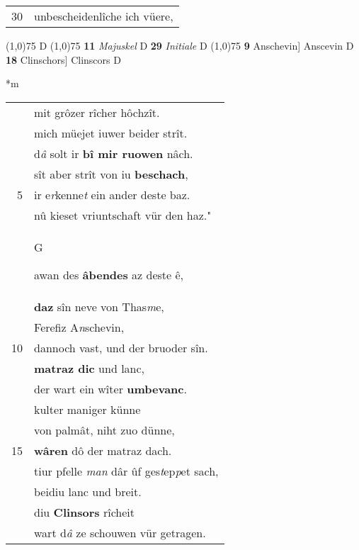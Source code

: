 \documentclass[8pt,a4paper,notitlepage]{article}
\begin{document}
\begin{table}[ht]
\begin{minipage}[t]{0.5\linewidth}
\begin{tabular}{rl}
30 & unbescheidenlîche ich vüere,\\ 
\end{tabular}
\scriptsize
\line(1,0){75} \newline
D \newline
\line(1,0){75} \newline
\textbf{11} \textit{Majuskel} D  \textbf{29} \textit{Initiale} D  \newline
\line(1,0){75} \newline
\textbf{9} Anschevin] Anscevin D \textbf{18} Clinschors] Clinscors D \newline
\end{minipage}
\hspace{0.5cm}
\begin{minipage}[t]{0.5\linewidth}
\small
\begin{center}*m
\end{center}
\begin{tabular}{rl}
 & mit grôzer rîcher hôchzît.\\ 
 & mich müejet iuwer beider strît.\\ 
 & d\textit{â} solt ir \textbf{bî mir ruowen} nâch.\\ 
 & sît aber strît von iu \textbf{beschach},\\ 
5 & ir e\textit{r}kenne\textit{t} ein ander deste baz.\\ 
 & nû kieset vriuntschaft vür den haz."\\ 
 & \begin{large}G\end{large}awan des \textbf{âbendes} az deste ê,\\ 
 & \textbf{daz} sîn neve von Thas\textit{m}e,\\ 
 & Ferefiz A\textit{n}schevin,\\ 
10 & dannoch vast, und der bruoder sîn.\\ 
 & \textbf{matraz dic} und lanc,\\ 
 & der wart ein wîter \textbf{umbevanc}.\\ 
 & kulter maniger künne\\ 
 & von palmât, niht zuo dünne,\\ 
15 & \textbf{wâren} dô der matraz dach.\\ 
 & tiur pfelle \textit{man} dâr ûf ges\textit{t}ep\textit{p}et sach,\\ 
 & beidiu lanc und breit.\\ 
 & diu \textbf{Clinsors} rîcheit\\ 
 & wart d\textit{â} ze schouwen vür getragen.\\ 

\end{tabular}
\end{minipage}
\end{table}
\end{document}
